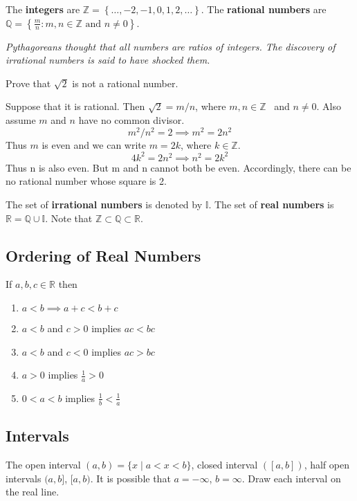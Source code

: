 \documentclass[calc1-main.tex]{subfiles}
\begin{document}
The \textbf{integers} are $\mathbb{Z}= \left\{ \dots, -2, -1, 0,1, 2, \dots \right\}$.
The \textbf{rational numbers} are $\mathbb{Q=}\left\{ \frac{m}{n}:m,n\in \mathbb{Z}\text{ and }n\neq 0\right\}$.

\textit{Pythagoreans thought that all numbers are ratios of integers. The discovery of irrational numbers is said to have shocked them.}

\begin{example}
Prove that $\sqrt{2}$ is not a rational number.
\end{example}
\begin{solution}
  Suppose that it is rational. Then $\sqrt{2}=m/n$, where $m,n\in \mathbb{Z}$ \ and $n\neq 0$. Also assume $m$ and $n$ have no common divisor.
  \[
    m^{2}/n^{2}=2  \implies m^{2}=2n^{2}
  \]
  Thus $m$ is even and we can write $m=2k$, where $k\in \mathbb{Z}$.
  \[
    4k^{2}=2n^{2} \implies n^{2}=2k^{2}
  \]
  Thus n is also even. But m and n cannot both be even. Accordingly, there can be no rational number whose square is 2.
\end{solution}

The set of \textbf{irrational numbers} is denoted by $\mathbb{I}$.
The set of \textbf{real numbers} is $\mathbb{R} = \mathbb{Q} \cup \mathbb{I}$.
Note that $\mathbb{Z} \subset \mathbb{Q} \subset \mathbb{R}$.

\subsection*{Ordering of Real Numbers}
If $a,b,c \in \mathbb{R}$ then
\begin{enumerate}
\item $a<b \implies a+c<b+c$

\item $a<b$ and $c>0$ implies $ac<bc$

\item $a<b$ and $c<0$ implies $ac>bc$

\item $a>0$ implies $\frac{1}{a}>0$

\item $0<a<b$ implies $\frac{1}{b}<\frac{1}{a}$
\end{enumerate}

\subsection*{Intervals}

The open interval $(a,b) = \{x \mid a < x < b\}$, closed interval $([a,b])$, half open intervals $(a, b]$, $[a, b)$. It is possible that $a=-\infty$, $b=\infty$.
Draw each interval on the real line.
\end{document}
